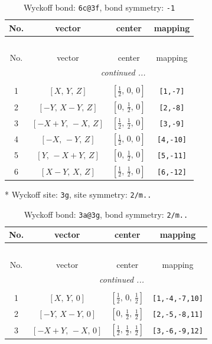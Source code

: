 \documentclass[fleqn,8pt]{jsarticle}
\begin{document}
\renewcommand{\arraystretch}{1.2}
\begin{longtable}{cccc}
\caption{Wyckoff bond: {\tt 6c@3f}, bond symmetry: {\tt -1}}
 \\
 \hline \hline
No. & vector & center & mapping \\ \hline \endfirsthead

\multicolumn{3}{l}{\tablename\ \thetable{}} \\
 \hline \hline
No. & vector & center & mapping \\ \hline \endhead

 \hline \hline
\multicolumn{3}{r}{\footnotesize\it continued ...} \\ \endfoot

 \hline \hline
\multicolumn{3}{r}{} \\ \endlastfoot

1 & $\left[ X,\, Y,\, Z \right]$ & $\left[ \frac{1}{2},\, 0,\, 0 \right]$ & {\tt [1,-7]} \\ \hline
2 & $\left[ - Y,\, X - Y,\, Z \right]$ & $\left[ 0,\, \frac{1}{2},\, 0 \right]$ & {\tt [2,-8]} \\ \hline
3 & $\left[ - X + Y,\, - X,\, Z \right]$ & $\left[ \frac{1}{2},\, \frac{1}{2},\, 0 \right]$ & {\tt [3,-9]} \\ \hline
4 & $\left[ - X,\, - Y,\, Z \right]$ & $\left[ \frac{1}{2},\, 0,\, 0 \right]$ & {\tt [4,-10]} \\ \hline
5 & $\left[ Y,\, - X + Y,\, Z \right]$ & $\left[ 0,\, \frac{1}{2},\, 0 \right]$ & {\tt [5,-11]} \\ \hline
6 & $\left[ X - Y,\, X,\, Z \right]$ & $\left[ \frac{1}{2},\, \frac{1}{2},\, 0 \right]$ & {\tt [6,-12]} \\
\end{longtable}
* Wyckoff site: {\tt 3g}, site symmetry: {\tt 2/m..}
\renewcommand{\arraystretch}{1.2}
\begin{longtable}{cccc}
\caption{Wyckoff bond: {\tt 3a@3g}, bond symmetry: {\tt 2/m..}}
 \\
 \hline \hline
No. & vector & center & mapping \\ \hline \endfirsthead

\multicolumn{3}{l}{\tablename\ \thetable{}} \\
 \hline \hline
No. & vector & center & mapping \\ \hline \endhead

 \hline \hline
\multicolumn{3}{r}{\footnotesize\it continued ...} \\ \endfoot

 \hline \hline
\multicolumn{3}{r}{} \\ \endlastfoot

1 & $\left[ X,\, Y,\, 0 \right]$ & $\left[ \frac{1}{2},\, 0,\, \frac{1}{2} \right]$ & {\tt [1,-4,-7,10]} \\ \hline
2 & $\left[ - Y,\, X - Y,\, 0 \right]$ & $\left[ 0,\, \frac{1}{2},\, \frac{1}{2} \right]$ & {\tt [2,-5,-8,11]} \\ \hline
3 & $\left[ - X + Y,\, - X,\, 0 \right]$ & $\left[ \frac{1}{2},\, \frac{1}{2},\, \frac{1}{2} \right]$ & {\tt [3,-6,-9,12]} \\
\end{longtable}
\end{document}
